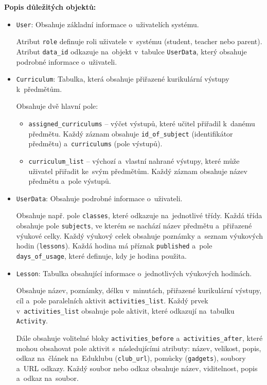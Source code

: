 \documentclass[male,czech,api_bc]{kitheses}
\begin{document}
\textbf{Popis důležitých objektů:}
\begin{itemize}
	\item \texttt{User}: Obsahuje základní informace o~uživatelích systému.
	
	Atribut \texttt{role} definuje roli uživatele v~systému (student, teacher nebo parent). Atribut \texttt{data\_id} odkazuje na~objekt v~tabulce \texttt{UserData}, který obsahuje podrobné informace o~uživateli.
	
	\item \texttt{Curriculum}: Tabulka, která obsahuje přiřazené kurikulární výstupy k~předmětům.
	
	Obsahuje dvě hlavní pole:
	\begin{itemize}
		\item \texttt{assigned\_curriculums} – výčet výstupů, které učitel přiřadil k~danému předmětu. Každý záznam obsahuje \texttt{id\_of\_subject} (identifikátor předmětu) a~\texttt{curriculums} (pole výstupů).
		\item \texttt{curriculum\_list} – výchozí a~vlastní nahrané výstupy, které může uživatel přiřadit ke~svým předmětům. Každý záznam obsahuje název předmětu a~pole výstupů.
	\end{itemize}
	
	\item \texttt{UserData}: Obsahuje podrobné informace o~uživateli.
	
	Obsahuje např. pole \texttt{classes}, které odkazuje na~jednotlivé třídy. Každá třída obsahuje pole \texttt{subjects}, ve kterém se nachází název předmětu a~přiřazené výukové celky. Každý výukový celek obsahuje poznámky a~seznam výukových hodin (\texttt{lessons}). Každá hodina má příznak \texttt{published} a~pole \texttt{days\_of\_usage}, které definuje, kdy je hodina použita.
	
	\item \texttt{Lesson}: Tabulka obsahující informace o~jednotlivých výukových hodinách.
	
	Obsahuje název, poznámky, délku v~minutách, přiřazené kurikulární výstupy, cíl a~pole paralelních aktivit \texttt{activities\_list}. Každý prvek v~\texttt{activities\_list} obsahuje pole aktivit, které odkazují na~tabulku \texttt{Activity}.
	
	Dále obsahuje volitelné bloky \texttt{activities\_before} a~\texttt{activities\_after}, které mohou obsahovat pole aktivit s~následujícími atributy: název, velikost, popis, odkaz na~článek na~Eduklubu (\texttt{club\_url}), pomůcky (\texttt{gadgets}), soubory a~URL odkazy. Každý soubor nebo odkaz obsahuje název, viditelnost, popis a~odkaz na~soubor.
\end{itemize}
\end{document}
